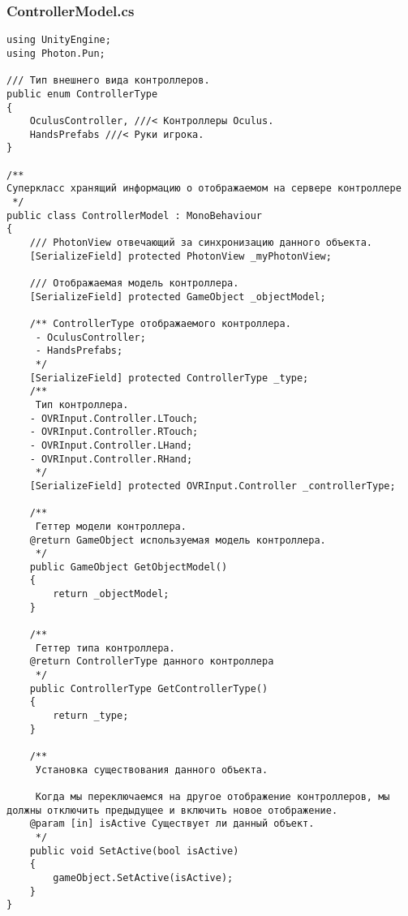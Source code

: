 \subsubsection*{ControllerModel.cs}
\begin{verbatim}
﻿using UnityEngine;
using Photon.Pun;

/// Тип внешнего вида контроллеров.
public enum ControllerType
{
    OculusController, ///< Контроллеры Oculus.
    HandsPrefabs ///< Руки игрока.
}

/**
Суперкласс хранящий информацию о отображаемом на сервере контроллере
 */
public class ControllerModel : MonoBehaviour
{
    /// PhotonView отвечающий за синхронизацию данного объекта.
    [SerializeField] protected PhotonView _myPhotonView;

    /// Отображаемая модель контроллера.
    [SerializeField] protected GameObject _objectModel;

    /** ControllerType отображаемого контроллера.
     - OculusController;
     - HandsPrefabs;
     */
    [SerializeField] protected ControllerType _type;
    /**
     Тип контроллера.
    - OVRInput.Controller.LTouch;
    - OVRInput.Controller.RTouch;
    - OVRInput.Controller.LHand;
    - OVRInput.Controller.RHand;
     */
    [SerializeField] protected OVRInput.Controller _controllerType;

    /**
     Геттер модели контроллера.
    @return GameObject используемая модель контроллера.
     */
    public GameObject GetObjectModel()
    {
        return _objectModel;
    }

    /**
     Геттер типа контроллера.
    @return ControllerType данного контроллера
     */
    public ControllerType GetControllerType()
    {
        return _type;
    }

    /** 
     Установка существования данного объекта. 
 
     Когда мы переключаемся на другое отображение контроллеров, мы должны отключить предыдущее и включить новое отображение.
    @param [in] isActive Существует ли данный объект.
     */
    public void SetActive(bool isActive)
    {
        gameObject.SetActive(isActive);
    }
}

\end{verbatim}
